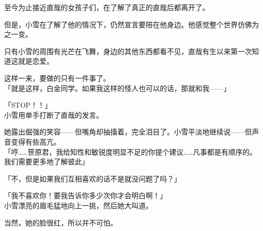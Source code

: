 至今为止接近直哉的女孩子们，在了解了真正的直哉后都离开了。

但是，小雪在了解了他的情况下，仍然宣言要陪在他身边。他感觉整个世界仿佛为之一变。

只有小雪的周围有光芒在飞舞，身边的其他东西都看不见，直哉有生以来第一次知道这就是恋爱。

这样一来，要做的只有一件事了。\\

「就是这样，白金同学。如果我这样的怪人也可以的话，那就和我——」

「STOP！！」\\

小雪用单手打断了直哉的发言。

她露出倔强的笑容——但嘴角却抽搐着，完全泪目了。小雪平淡地继续说——但声音变得有些高亢。\\

「哼……笹原君，我给知性和敏锐度明显不足的你提个建议……凡事都是有顺序的。我们需要更多地了解彼此」

「不，但是如果我们互相喜欢的话不是就没问题了吗？」

「我不喜欢你！要我告诉你多少次你才会明白啊！」\\

小雪漂亮的眉毛猛地向上一挑，然后她大叫道。

当然，她的脸很红，所以并不可怕。\\

